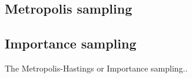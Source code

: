 \subsection{Metropolis sampling}

\subsection{Importance sampling}
The Metropolis-Hastings or Importance sampling.. 

